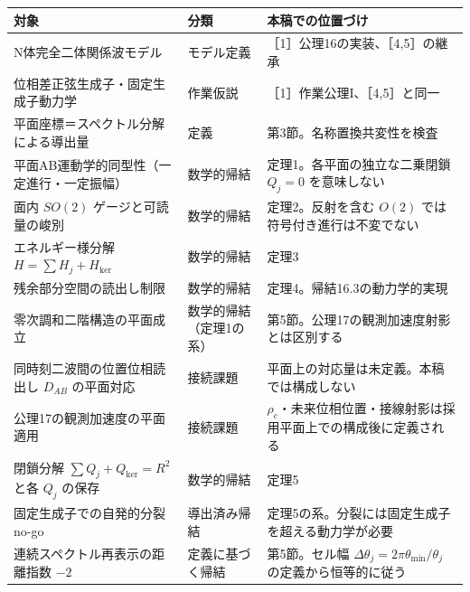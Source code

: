 \documentclass[
  a4paper,
]{ltjsarticle}
\newcounter{none} %
\begin{document}
{\def\LTcaptype{none} %
\begin{longtable}[]{@{}
  >{\raggedright\arraybackslash}p{}
  >{\raggedright\arraybackslash}p{}
  >{\raggedright\arraybackslash}p{}@{}}
\toprule\noalign{}
\begin{minipage}[b]{\linewidth}\raggedright
対象
\end{minipage} & \begin{minipage}[b]{\linewidth}\raggedright
分類
\end{minipage} & \begin{minipage}[b]{\linewidth}\raggedright
本稿での位置づけ
\end{minipage} \\
\midrule\noalign{}
\endhead
\bottomrule\noalign{}
\endlastfoot
N体完全二体関係波モデル & モデル定義 &
［1］公理16の実装、［4,5］の継承 \\
位相差正弦生成子・固定生成子動力学 & 作業仮説 &
［1］作業公理I、［4,5］と同一 \\
平面座標＝スペクトル分解による導出量 & 定義 &
第3節。名称置換共変性を検査 \\
平面AB運動学的同型性（一定進行・一定振幅） & 数学的帰結 &
定理1。各平面の独立な二乗閉鎖 \(Q_j=0\) を意味しない \\
面内 \(SO(2)\) ゲージと可読量の峻別 & 数学的帰結 & 定理2。反射を含む
\(O(2)\) では符号付き進行は不変でない \\
エネルギー様分解 \(H=\sum H_j+H_{\ker}\) & 数学的帰結 & 定理3 \\
残余部分空間の読出し制限 & 数学的帰結 & 定理4。帰結16.3の動力学的実現 \\
零次調和二階構造の平面成立 & 数学的帰結（定理1の系） &
第5節。公理17の観測加速度射影とは区別する \\
同時刻二波間の位置位相読出し \(D_{AB}\) の平面対応 & 接続課題 &
平面上の対応量は未定義。本稿では構成しない \\
公理17の観測加速度の平面適用 & 接続課題 &
\(\rho_c\)・未来位相位置・接線射影は採用平面上での構成後に定義される \\
閉鎖分解 \(\sum Q_j+Q_{\ker}=R^2\) と各 \(Q_j\) の保存 & 数学的帰結 &
定理5 \\
固定生成子での自発的分裂no-go & 導出済み帰結 &
定理5の系。分裂には固定生成子を超える動力学が必要 \\
連続スペクトル再表示の距離指数 \(-2\) & 定義に基づく帰結 & 第5節。セル幅
\(\Delta\theta_j=2\pi\theta_{\min}/\theta_j\) の定義から恒等的に従う \\

\end{longtable}}
\end{document}
